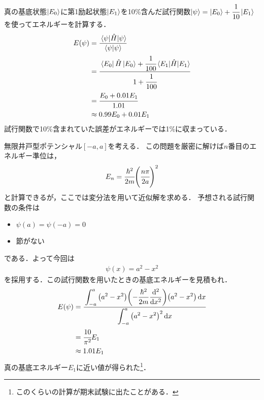 \documentclass{report}
\begin{document}
  真の基底状態$\ket{E_0}$に第1励起状態$\ket{E_1}$を10\%含んだ試行関数$\ket{\psi} = \ket{E_0} + \cfrac{1}{10}\ket{E_1}$を使ってエネルギーを計算する．
  \begin{align}
    E(\psi) &= \frac{\mel{\psi}{\hat{H}}{\psi}}{\braket{\psi}} \\
    &= \cfrac{\bra{E_0}\hat{H}\ket{E_0} + \cfrac{1}{100}\mel{E_1}{\hat{H}}{E_1}}{1 + \cfrac{1}{100}} \\
    &= \cfrac{E_0 + 0.01E_1}{1.01}\\
    &\approx 0.99E_0 + 0.01E_1
  \end{align}
  試行関数で10\%含まれていた誤差がエネルギーでは1\%に収まっている．
  \begin{myex}{}{}
    無限井戸型ポテンシャル$[-a, a]$を考える．
    この問題を厳密に解けば$n$番目のエネルギー準位は，
    \begin{align}
      E_n = \cfrac{\hbar^2}{2m}\qty(\cfrac{n\pi}{2a})^2
    \end{align}
    と計算できるが，ここでは変分法を用いて近似解を求める．
    予想される試行関数の条件は
    \begin{itemize}
      \item $\psi(a) = \psi(-a) = 0$
      \item 節がない
    \end{itemize}
    である．よって今回は
    \begin{align}
      \psi(x) = a^2 - x^2
    \end{align}
    を採用する．この試行関数を用いたときの基底エネルギーを見積もれ．
    \tcblower
    \begin{align}
      E(\psi) &= \cfrac{\displaystyle \int_{-a}^{a}\qty(a^2 - x^2)\qty(-\frac{\hbar^2}{2m}\dv[2]{x})\qty(a^2 - x^2)\dd{x}}{\displaystyle \int_{-a}^{a}\qty(a^2 - x^2)^2\dd{x}} \\
      &= \cfrac{10}{\pi^2}E_1 \\
      &\approx 1.01E_1
    \end{align}
    真の基底エネルギー$E_1$に近い値が得られた\footnote{このくらいの計算が期末試験に出たことがある．}．
  \end{myex}
\end{document}
